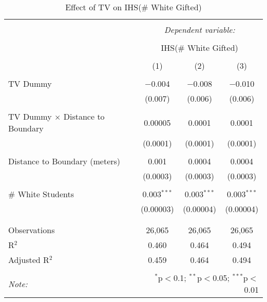 
\begin{table}[!htbp] \centering 
  \caption{Effect of TV on IHS(\# White Gifted)} 
  \label{} 
\begin{tabular}{@{\extracolsep{-2pt}}lccc} 
\\[-1.8ex]\hline 
\hline \\[-1.8ex] 
 & \multicolumn{3}{c}{\textit{Dependent variable:}} \\ 
\cline{2-4} 
\\[-1.8ex] & \multicolumn{3}{c}{IHS(\# White Gifted)} \\ 
\\[-1.8ex] & (1) & (2) & (3)\\ 
\hline \\[-1.8ex] 
 TV Dummy & $-$0.004 & $-$0.008 & $-$0.010 \\ 
  & (0.007) & (0.006) & (0.006) \\ 
  & & & \\ 
 TV Dummy $\times$ Distance to Boundary & 0.00005 & 0.0001 & 0.0001 \\ 
  & (0.0001) & (0.0001) & (0.0001) \\ 
  & & & \\ 
 Distance to Boundary (meters) & 0.001 & 0.0004 & 0.0004 \\ 
  & (0.0003) & (0.0003) & (0.0003) \\ 
  & & & \\ 
 \# White Students & 0.003$^{***}$ & 0.003$^{***}$ & 0.003$^{***}$ \\ 
  & (0.00003) & (0.00004) & (0.00004) \\ 
  & & & \\ 
\hline \\[-1.8ex] 
Observations & 26,065 & 26,065 & 26,065 \\ 
R$^{2}$ & 0.460 & 0.464 & 0.494 \\ 
Adjusted R$^{2}$ & 0.459 & 0.464 & 0.494 \\ 
\hline 
\hline \\[-1.8ex] 
\textit{Note:}  & \multicolumn{3}{r}{$^{*}$p$<$0.1; $^{**}$p$<$0.05; $^{***}$p$<$0.01} \\ 
\end{tabular} 
\end{table} 
